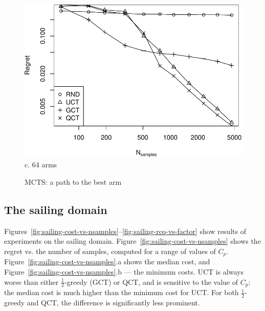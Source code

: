 \documentclass{article}
\begin{document}
\begin{figure}
\begin{minipage}[c]{0.5\linewidth}
    \includegraphics[scale=0.4]{tree-identity-k=64-uqb=8.pdf} \\
    c. 64 arms
 \end{minipage}
  \label{fig:mcts-regret}
  \caption{MCTS: a path to the best arm}
\end{figure}

\subsection{The sailing domain}
\label{seq:emp-sailing}

Figures~\ref{fig:sailing-cost-vs-nsamples}--\ref{fig:sailing-rcq-vs-factor}
show results of experiments on the sailing
domain. Figure~\ref{fig:sailing-cost-vs-nsamples} shows the regret
vs. the number of samples, computed for a range of values of
$C_p$. Figure~\ref{fig:sailing-cost-vs-nsamples}.a shows the median
cost, and Figure~\ref{fig:sailing-cost-vs-nsamples}.b --- the minimum
costs. UCT is always worse than either $\frac 1 2$-greedy (GCT) or QCT, and is sensitive to
the value of $C_p$: the median cost is much higher than the minimum
cost for UCT. For both $\frac 1 2$-greedy and QCT, the difference is
significantly less prominent.
\end{document}
